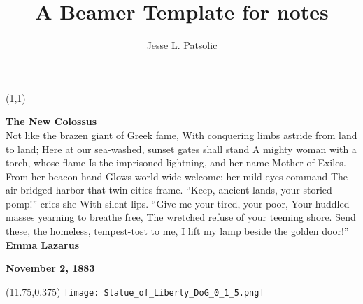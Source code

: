 \documentclass[xcolor=dvipsnames, aspectratio=169]{beamer}
\title[Daily Notes]{A Beamer Template for notes}
\subtitle[]{}
\author[JLP]{Jesse L. Patsolic}
\begin{document}
\begin{frame}[plain]
\begin{textblock}{3.25}(1,1)
    {\color{gray!!50}
\tiny
\textbf{The New Colossus}\\

Not like the brazen giant of Greek fame,
With conquering limbs astride from land to land;
Here at our sea-washed, sunset gates shall stand
A mighty woman with a torch, whose flame
Is the imprisoned lightning, and her name
Mother of Exiles. From her beacon-hand
Glows world-wide welcome; her mild eyes command
The air-bridged harbor that twin cities frame.
``Keep, ancient lands, your storied pomp!'' cries she
With silent lips. ``Give me your tired, your poor,
Your huddled masses yearning to breathe free,
The wretched refuse of your teeming shore.
Send these, the homeless, tempest-tost to me,
I lift my lamp beside the golden door!''\\


\textbf{Emma Lazarus}

\textbf{November 2, 1883}
}
\end{textblock}

\begin{textblock}{5}(11.75,0.375)
\texttt{[image: Statue\_of\_Liberty\_DoG\_0\_1\_5.png]}

\end{textblock}
\end{frame}
\end{document}
